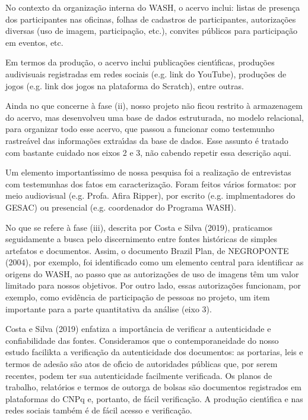 \documentclass[
12pt,		%
openright,	%
twoside,  %
a4paper,			%
chapter=TITLE,		%
english,			%
french,				%
spanish,			%
brazil				%
]{USPSC-classe/USPSC}
\begin{document}
No contexto da organiza\c{c}\~ao interna do WASH, o acervo inclui: listas de presen\c{c}a dos participantes nas oficinas, folhas de cadastros de participantes, autoriza\c{c}\~oes diversas (uso de imagem, participa\c{c}\~ao, etc.), convites p\'ublicos  para participa\c{c}\~ao em eventos, etc.




Em termos da produ\c{c}\~ao, o acervo inclui publica\c{c}\~oes cient\'{\i}ficas, produ\c{c}\~oes audivisuais registradas em redes sociais (e.g. link do YouTube), produ\c{c}\~oes de jogos (e.g. link dos jogos na plataforma do Scratch), entre outras.




Ainda no que concerne \`a fase (ii), nosso projeto n\~ao ficou restrito \`a armazenagem do acervo, mas desenvolveu uma base de dados estruturada, no modelo relacional, para organizar todo esse acervo, que passou a funcionar como testemunho rastre\'avel das informa\c{c}\~oes extra\'{\i}das da base de dados. Esse assunto \'e tratado com bastante cuidado nos eixos 2 e 3, n\~ao cabendo repetir essa descri\c{c}\~ao aqui.




Um elemento important\'{\i}ssimo de nossa pesquisa foi a realiza\c{c}\~ao de entrevistas com testemunhas dos fatos em caracteriza\c{c}\~ao. Foram feitos v\'arios formatos: por meio audiovisual (e.g. Profa. Afira Ripper), por escrito (e.g. implmentadores do GESAC) ou presencial (e.g. coordenador do Programa WASH).




No que se refere \`a fase (iii), descrita por  Costa e Silva (2019), praticamos seguidamente a busca pelo discernimento entre fontes hist\'oricas de simples artefatos e documentos. Assim, o documento \textquotedbl Brazil Plan\textquotedbl , de  NEGROPONTE (2004), por exemplo, foi identificado como um elemento central para identificar as origens do WASH, ao passo que as autoriza\c{c}\~oes de uso de imagens t\^em um valor limitado para nossos objetivos.  Por outro lado, essas autoriza\c{c}\~oes funcionam, por exemplo, como evid\^encia de participa\c{c}\~ao de pessoas no projeto, um item importante para a parte quantitativa da an\'alise (eixo 3).




Costa e Silva (2019) enfatiza a import\^ancia de verificar a autenticidade e confiabilidade das fontes. Consideramos que o contemporaneidade do nosso estudo facilikta a verifica\c{c}\~ao da autenticidade dos documentos: as portarias, leis e termos de ades\~ao s\~ao atos de of\'{\i}cio de autoridades p\'ublicas que, por serem recentes, podem ter sua autenticidade facilmente verificada. Os planos de trabalho, relat\'orios e termos de outorga de bolsas s\~ao documentos registrados em plataformas do CNPq e, portanto, de f\'acil verifica\c{c}\~ao. A produ\c{c}\~ao cient\'{\i}fica e nas redes sociais tamb\'em \'e de f\'acil acesso e verifica\c{c}\~ao.
\end{document}
